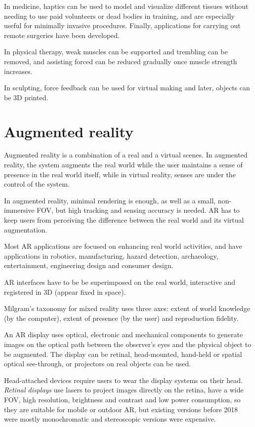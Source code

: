 \documentclass[a4paper]{article}
\begin{document}
In medicine, haptics can be used to model and visualize different tissues without needing to use paid volunteers or dead bodies in training, and are especially useful for minimally invasive procedures.
Finally, applications for carrying out remote surgeries have been developed.

In physical therapy, weak muscles can be supported and trembling can be removed, and assisting forced can be reduced gradually once muscle strength increases.

In sculpting, force feedback can be used for virtual making and later, objects can be 3D printed.

\section{Augmented reality}
Augmented reality is a combination of a real and a virtual scenes.
In augmented reality, the system augments the real world while the user maintains a sense of presence in the real world itself, while in virtual reality, senses are under the control of the system.

In augmented reality, minimal rendering is enough, as well as a small, non-immersive FOV, but high tracking and sensing accuracy is needed.
AR has to keep users from perceiving the difference between the real world and its virtual augmentation.

Most AR applications are focused on enhancing real world activities, and have applications in robotics, manufacturing, hazard detection, archaeology, entertainment, engineering design and consumer design.

AR interfaces have to be be superimposed on the real world, interactive and registered in 3D (appear fixed in space).

Milgram's taxonomy for mixed reality uses three axes: extent of world knowledge (by the computer), extent of presence (by the user) and reproduction fidelity.

An AR display uses optical, electronic and mechanical components to generate images on the optical path between the observer's eyes and the physical object to be augmented.
The display can be retinal, head-mounted, hand-held or spatial optical see-through, or projectors on real objects can be used.

Head-attached devices require users to wear the display systems on their head.
\emph{Retinal displays} use lasers to project images directly on the retina, have a wide FOV, high resolution, brightness and contrast and low power consumption, so they are suitable for mobile or outdoor AR, but existing versions before 2018 were mostly monochromatic and stereoscopic versions were expensive.
\end{document}
